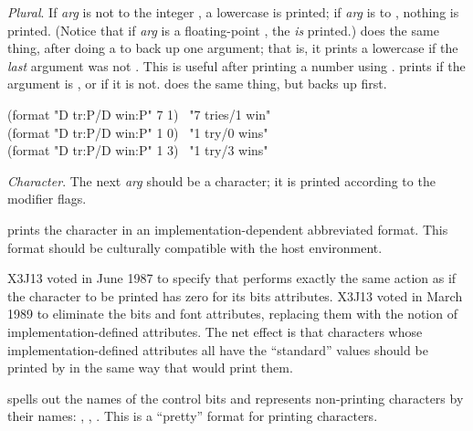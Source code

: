 \begin{flushdesc}
\item[\cd{{\Xtilde}P}]
\emph{Plural}.
If \emph{arg} is not  to the integer , a lowercase  is
printed; if \emph{arg} is  to , nothing is printed.  (Notice
that if \emph{arg} is a floating-point , the  \emph{is}
printed.)
 does the same thing, after doing a \cd{{\Xtilde}:*} to back up one argument;
that is, it prints a lowercase  if the \emph{last} argument was not
.  This is useful after printing a number using .
 prints  if the argument is , or  if it is
not.   does the same thing, but backs up first.
\begin{lisp}
(format {\false} "{\Xtilde}D tr{\Xtilde}:{\Xatsign}P/{\Xtilde}D win{\Xtilde}:P" 7 1) \EV\ "7 tries/1 win" \\
(format {\false} "{\Xtilde}D tr{\Xtilde}:{\Xatsign}P/{\Xtilde}D win{\Xtilde}:P" 1 0) \EV\ "1 try/0 wins" \\
(format {\false} "{\Xtilde}D tr{\Xtilde}:{\Xatsign}P/{\Xtilde}D win{\Xtilde}:P" 1 3) \EV\ "1 try/3 wins"
\end{lisp}

\item[\cd{{\Xtilde}C}]
\emph{Character}.  The next \emph{arg} should be a character; it is printed
according to the modifier flags.

\begin{obsolete}
 prints the character in an implementation-dependent
abbreviated format.  This format should be culturally compatible with the
host environment.
\end{obsolete}

\begin{newer}
X3J13 voted in June 1987  to specify that
 performs exactly the same action as 
if the character to be printed has zero for its bits attributes.
X3J13 voted in March 1989  to eliminate
the bits and font attributes, replacing them with the notion of
implementation-defined attributes.  The net effect is that characters
whose implementation-defined attributes all have the ``standard''
values should be printed by  in the same way
that  would print them.
\end{newer}

 spells out the names of the control bits
and represents non-printing characters
by their names: , , .
This is a ``pretty'' format for printing characters.


\end{flushdesc}
